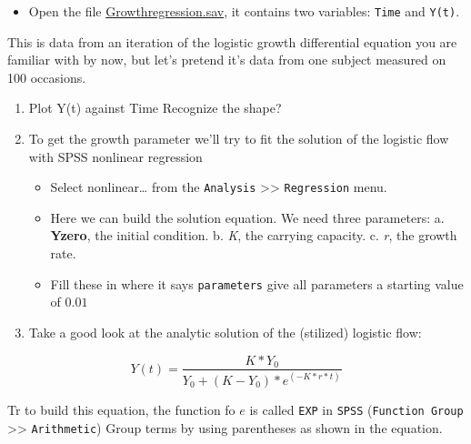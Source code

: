 \documentclass[]{book}
\providecommand{\tightlist}{%
  \setlength{\itemsep}{0pt}\setlength{\parskip}{0pt}}
\begin{document}
\begin{itemize}
\tightlist
\item
  Open the file
  \href{https://github.com/FredHasselman/DCS/blob/master/assignmentData/BasicTSA_nonlinreg/GrowthRegression.sav}{Growthregression.sav},
  it contains two variables: \texttt{Time} and \texttt{Y(t)}.
\end{itemize}

This is data from an iteration of the logistic growth differential
equation you are familiar with by now, but let's pretend it's data from
one subject measured on 100 occasions.

\begin{enumerate}
\def\labelenumi{\arabic{enumi}.}
\tightlist
\item
  Plot Y(t) against Time Recognize the shape?
\item
  To get the growth parameter we'll try to fit the solution of the
  logistic flow with SPSS nonlinear regression

  \begin{itemize}
  \tightlist
  \item
    Select nonlinear\ldots{} from the \texttt{Analysis}
    \textgreater{}\textgreater{} \texttt{Regression} menu.
  \item
    Here we can build the solution equation. We need three parameters:
    a. \textbf{Yzero}, the initial condition. b. \emph{K}, the carrying
    capacity. c. \emph{r}, the growth rate.
  \item
    Fill these in where it says \texttt{parameters} give all parameters
    a starting value of \(0.01\)
  \end{itemize}
\item
  Take a good look at the analytic solution of the (stilized) logistic
  flow:
\end{enumerate}

\[
Y(t)  =  \frac{K * Y_0}{Y_0 + \left(K-Y_{0}\right) * e^{(-K*r*t)} }
\]

Tr to build this equation, the function fo \(e\) is called \texttt{EXP}
in \texttt{SPSS} (\texttt{Function\ Group} \textgreater{}\textgreater{}
\texttt{Arithmetic}) Group terms by using parentheses as shown in the
equation.
\end{document}
